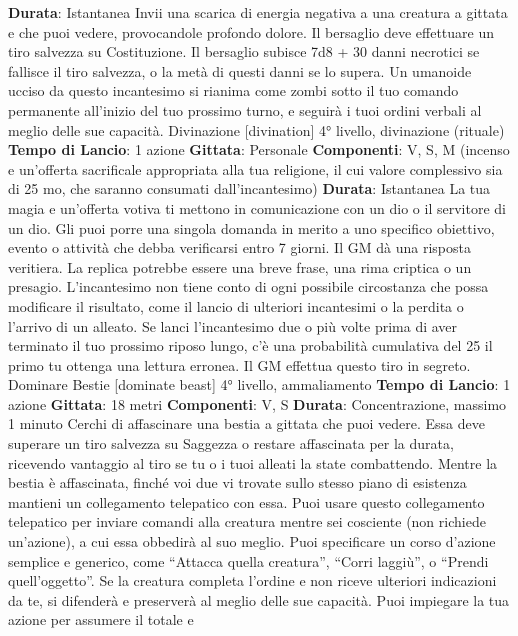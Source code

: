 \begin{multicols}{2}
\textbf{Durata}: Istantanea
Invii una scarica di energia negativa a una creatura a
gittata e che puoi vedere, provocandole profondo
dolore. Il bersaglio deve effettuare un tiro salvezza su
Costituzione. Il bersaglio subisce 7d8 + 30 danni
necrotici se fallisce il tiro salvezza, o la metà di questi
danni se lo supera.
Un umanoide ucciso da questo incantesimo si rianima
come zombi sotto il tuo comando permanente all’inizio
del tuo prossimo turno, e seguirà i tuoi ordini verbali al
meglio delle sue capacità.
Divinazione
[divination]
4° livello, divinazione (rituale)
\textbf{Tempo di Lancio}: 1 azione
\textbf{Gittata}: Personale
\textbf{Componenti}: V, S, M (incenso e un’offerta sacrificale
appropriata alla tua religione, il cui valore complessivo
sia di 25 mo, che saranno consumati dall’incantesimo)
\textbf{Durata}: Istantanea
La tua magia e un’offerta votiva ti mettono in
comunicazione con un dio o il servitore di un dio. Gli
puoi porre una singola domanda in merito a uno
specifico obiettivo, evento o attività che debba
verificarsi entro 7 giorni. Il GM dà una risposta veritiera.
La replica potrebbe essere una breve frase, una rima
criptica o un presagio.
L’incantesimo non tiene conto di ogni possibile
circostanza che possa modificare il risultato, come il
lancio di ulteriori incantesimi o la perdita o l’arrivo di un
alleato.
Se lanci l’incantesimo due o più volte prima di aver
terminato il tuo prossimo riposo lungo, c’è una
probabilità cumulativa del 25%
il primo tu ottenga una lettura erronea. Il GM effettua
questo tiro in segreto.
Dominare Bestie
[dominate beast]
4° livello, ammaliamento
\textbf{Tempo di Lancio}: 1 azione
\textbf{Gittata}: 18 metri
\textbf{Componenti}: V, S
\textbf{Durata}: Concentrazione, massimo 1 minuto
Cerchi di affascinare una bestia a gittata che puoi
vedere. Essa deve superare un tiro salvezza su
Saggezza o restare affascinata per la durata, ricevendo
vantaggio al tiro se tu o i tuoi alleati la state
combattendo.
Mentre la bestia è affascinata, finché voi due vi trovate
sullo stesso piano di esistenza mantieni un
collegamento telepatico con essa. Puoi usare questo
collegamento telepatico per inviare comandi alla
creatura mentre sei cosciente (non richiede un’azione),
a cui essa obbedirà al suo meglio. Puoi specificare un
corso d’azione semplice e generico, come “Attacca
quella creatura”, “Corri laggiù”, o “Prendi quell’oggetto”.
Se la creatura completa l’ordine e non riceve ulteriori
indicazioni da te, si difenderà e preserverà al meglio
delle sue capacità.
Puoi impiegare la tua azione per assumere il totale e

\end{multicols}
